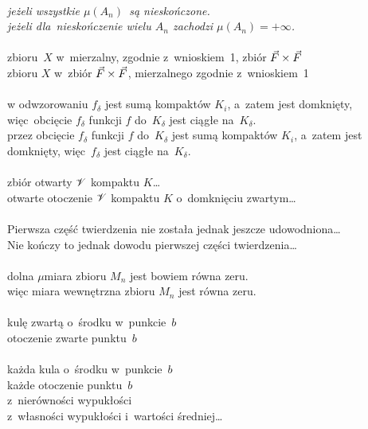 \documentclass[a4paper,11pt]{article}
\numberwithin{equation}{section}
\begin{document}
 \\
\Jest  \textit{jeżeli wszystkie $\mu( A_{ n } )$~są nieskończone.} \\
\Powin \textit{jeżeli dla~nieskończenie wielu $A_{ n }$ zachodzi
  $\mu( A_{ n } ) = +\infty$.} \\
 \\
\Jest  zbioru~$X$ w~mierzalny, zgodnie z~wnioskiem~1,
zbiór $\vec{F} \times \vec{F}$ \\
\Powin zbioru $X$ w~zbiór $\vec{F} \times \vec{F}$, mierzalnego
zgodnie
z~wnioskiem~1 \\
 \\
\Jest w odwzorowaniu $f_{ \delta }$ jest sumą kompaktów $K_{ i }$,
a~zatem jest domknięty, więc~obcięcie $f_{ \delta }$ funkcji $f$
do~$K_{ \delta }$ jest ciągłe na~$K_{ \delta }$. \\
\Powin przez obcięcie $f_{ \delta }$ funkcji $f$ do~$K_{ \delta }$
jest sumą kompaktów $K_{ i }$, a~zatem jest domknięty,
więc~$f_{ \delta }$ jest ciągłe na~$K_{ \delta }$. \\
 \\
\Jest zbiór otwarty $\mathcal{V}$ kompaktu $K$\ldots \\
\Powin otwarte otoczenie $\mathcal{V}$ kompaktu $K$ o~domknięciu
zwartym\ldots \\
 \\
\Jest Pierwsza część twierdzenia nie została jednak jeszcze
udowodniona\ldots \\
\Powin  Nie kończy to jednak dowodu pierwszej części twierdzenia\ldots \\
 \\
\Jest dolna $\mu$\dywiz miara zbioru $M_{ n }$ jest bowiem równa zeru. \\
\Powin  więc miara wewnętrzna zbioru $M_{ n }$ jest równa zeru. \\
 \\
\Jest kulę zwartą o~środku w~punkcie~$b$ \\
\Powin  otoczenie zwarte punktu~$b$ \\
 \\
\Jest każda kula o~środku w~punkcie~$b$ \\
\Powin każde otoczenie punktu~$b$
 \\
\Jest z~nierówności wypukłości \\
\Powin  z~własności wypukłości i~wartości średniej\ldots \\
 \\
\end{document}
